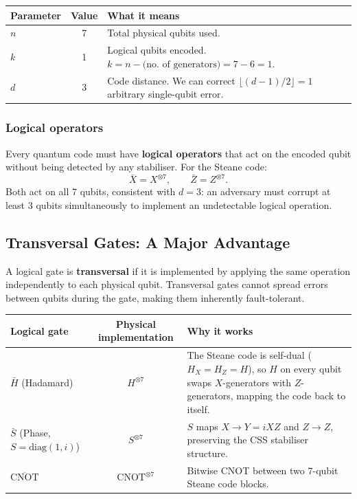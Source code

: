 \documentclass[11pt, a4paper]{article}
\theoremstyle{definition}
\theoremstyle{plain}
\theoremstyle{remark}
\begin{document}
\begin{center}
\renewcommand{\arraystretch}{1.3}
\begin{tabular}{@{} l c p{7cm} @{}}
  \toprule
  \textbf{Parameter} & \textbf{Value} & \textbf{What it means}\\
  \midrule
  $n$ & 7 & Total physical qubits used.\\
  $k$ & 1 & Logical qubits encoded.
            $k = n - \text{(no.\ of generators)} = 7 - 6 = 1$.\\
  $d$ & 3 & Code distance.  We can correct
            $\lfloor(d-1)/2\rfloor = 1$ arbitrary single-qubit error.\\
  \bottomrule
\end{tabular}
\end{center}

\subsubsection{Logical operators}

Every quantum code must have \textbf{logical operators} that act on
the encoded qubit without being detected by any stabiliser.  For the
Steane code:
\[
  \bar{X} = X^{\otimes 7}, \qquad \bar{Z} = Z^{\otimes 7}.
\]
Both act on all 7 qubits, consistent with $d=3$: an adversary must
corrupt at least 3 qubits simultaneously to implement an undetectable
logical operation.

\subsection{Transversal Gates: A Major Advantage}

A logical gate is \textbf{transversal} if it is implemented by
applying the same operation independently to each physical qubit.
Transversal gates cannot spread errors between qubits during the
gate, making them inherently fault-tolerant.

\begin{center}
\renewcommand{\arraystretch}{1.4}
\begin{tabular}{@{} l c p{6.5cm} @{}}
  \toprule
  \textbf{Logical gate} & \textbf{Physical implementation}
  & \textbf{Why it works}\\
  \midrule
  $\bar{H}$ (Hadamard) & $H^{\otimes 7}$
    & The Steane code is self-dual ($H_X = H_Z = H$), so $H$ on every
      qubit swaps $X$-generators with $Z$-generators, mapping the code
      back to itself.\\[6pt]
  $\bar{S}$ (Phase, $S=\mathrm{diag}(1,i)$) & $S^{\otimes 7}$
    & $S$ maps $X\to Y=iXZ$ and $Z\to Z$, preserving the CSS
      stabiliser structure.\\[6pt]
  $\overline{\mathrm{CNOT}}$ & $\mathrm{CNOT}^{\otimes 7}$
    & Bitwise CNOT between two 7-qubit Steane code blocks.\\
  \bottomrule
\end{tabular}
\end{center}
\end{document}
